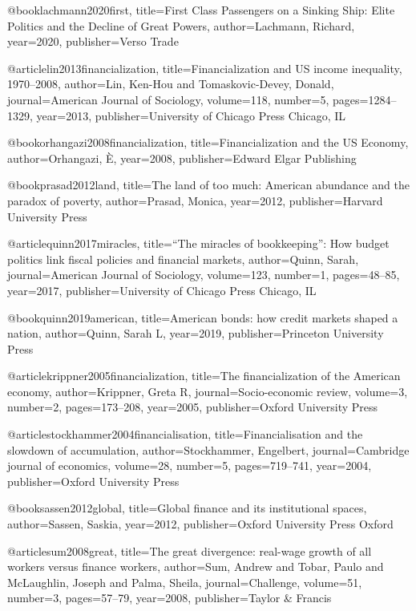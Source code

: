 @book{lachmann2020first,
  title={First Class Passengers on a Sinking Ship: Elite Politics and the Decline of Great Powers},
  author={Lachmann, Richard},
  year={2020},
  publisher={Verso Trade}
}

@article{lin2013financialization,
  title={Financialization and US income inequality, 1970--2008},
  author={Lin, Ken-Hou and Tomaskovic-Devey, Donald},
  journal={American Journal of Sociology},
  volume={118},
  number={5},
  pages={1284--1329},
  year={2013},
  publisher={University of Chicago Press Chicago, IL}
}

@book{orhangazi2008financialization,
  title={Financialization and the US Economy},
  author={Orhangazi, {\`E}},
  year={2008},
  publisher={Edward Elgar Publishing}
}

@book{prasad2012land,
  title={The land of too much: American abundance and the paradox of poverty},
  author={Prasad, Monica},
  year={2012},
  publisher={Harvard University Press}
}

@article{quinn2017miracles,
  title={“The miracles of bookkeeping”: How budget politics link fiscal policies and financial markets},
  author={Quinn, Sarah},
  journal={American Journal of Sociology},
  volume={123},
  number={1},
  pages={48--85},
  year={2017},
  publisher={University of Chicago Press Chicago, IL}
}

@book{quinn2019american,
  title={American bonds: how credit markets shaped a nation},
  author={Quinn, Sarah L},
  year={2019},
  publisher={Princeton University Press}
}

@article{krippner2005financialization,
  title={The financialization of the American economy},
  author={Krippner, Greta R},
  journal={Socio-economic review},
  volume={3},
  number={2},
  pages={173--208},
  year={2005},
  publisher={Oxford University Press}
}

@article{stockhammer2004financialisation,
  title={Financialisation and the slowdown of accumulation},
  author={Stockhammer, Engelbert},
  journal={Cambridge journal of economics},
  volume={28},
  number={5},
  pages={719--741},
  year={2004},
  publisher={Oxford University Press}
}

@book{sassen2012global,
  title={Global finance and its institutional spaces},
  author={Sassen, Saskia},
  year={2012},
  publisher={Oxford University Press Oxford}
}

@article{sum2008great,
  title={The great divergence: real-wage growth of all workers versus finance workers},
  author={Sum, Andrew and Tobar, Paulo and McLaughlin, Joseph and Palma, Sheila},
  journal={Challenge},
  volume={51},
  number={3},
  pages={57--79},
  year={2008},
  publisher={Taylor \& Francis}
}

